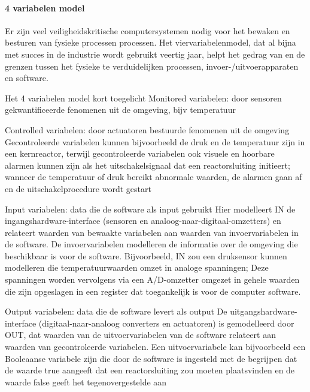 \documentclass{article}
\begin{document}
	
	
	\paragraph{4 variabelen model}
	
	Er zijn veel veiligheidskritische computersystemen nodig voor het bewaken en besturen van fysieke processen
	processen. Het viervariabelenmodel, dat al bijna met succes in de industrie wordt gebruikt
	veertig jaar, helpt het gedrag van en de grenzen tussen het fysieke te verduidelijken
	processen, invoer-/uitvoerapparaten en software. \cite{ImplementabilityOf4VarSCP2015}
	
	
	
	Het 4 variabelen model kort toegelicht
	Monitored variabelen: door sensoren gekwantificeerde fenomenen uit de omgeving, bijv temperatuur
	
	Controlled variabelen: door actuatoren bestuurde fenomenen uit de omgeving
	Gecontroleerde variabelen kunnen bijvoorbeeld de druk en de temperatuur zijn
	in een kernreactor, terwijl gecontroleerde variabelen ook visuele en hoorbare alarmen kunnen zijn
	als het uitschakelsignaal dat een reactorsluiting initieert; wanneer de temperatuur of druk bereikt
	abnormale waarden, de alarmen gaan af en de uitschakelprocedure wordt gestart
	
	Input variabelen: data die de software als input gebruikt
	Hier modelleert IN de ingangshardware-interface (sensoren en analoog-naar-digitaal-omzetters) en
	relateert waarden van bewaakte variabelen aan waarden van invoervariabelen in de software. De invoervariabelen modelleren de informatie over de omgeving die beschikbaar is voor de software. Bijvoorbeeld,
	IN zou een druksensor kunnen modelleren die temperatuurwaarden omzet in analoge spanningen; Deze spanningen worden vervolgens via een A/D-omzetter omgezet in gehele waarden die zijn opgeslagen in een register dat toegankelijk is voor de computer
	software.
	
	Output variabelen: data die de software levert als output
	De uitgangshardware-interface (digitaal-naar-analoog converters en actuatoren) is gemodelleerd
	door OUT, dat waarden van de uitvoervariabelen van de software relateert aan waarden van gecontroleerde variabelen. Een uitvoervariabele kan bijvoorbeeld een Booleaanse variabele zijn die door de software is ingesteld met de
	begrijpen dat de waarde true aangeeft dat een reactorsluiting zou moeten plaatsvinden en de waarde
	false geeft het tegenovergestelde aan
	
\end{document}
